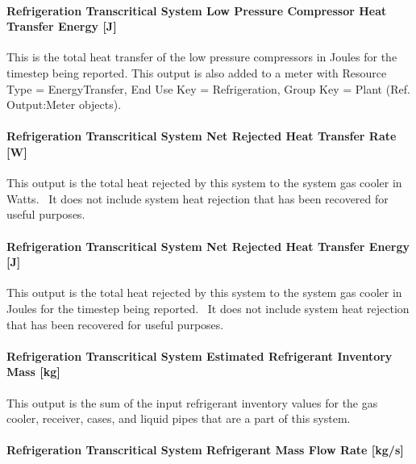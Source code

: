 \paragraph{Refrigeration Transcritical System Low Pressure Compressor Heat Transfer Energy {[}J{]}}\label{refrigeration-transcritical-system-low-pressure-compressor-heat-transfer-energy-j}

This is the total heat transfer of the low pressure compressors in Joules for the timestep being reported. This output is also added to a meter with Resource Type = EnergyTransfer, End Use Key = Refrigeration, Group Key = Plant (Ref. Output:Meter objects).

\paragraph{Refrigeration Transcritical System Net Rejected Heat Transfer Rate {[}W{]}}\label{refrigeration-transcritical-system-net-rejected-heat-transfer-rate-w}

This output is the total heat rejected by this system to the system gas cooler in Watts.~ It does not include system heat rejection that has been recovered for useful purposes.

\paragraph{Refrigeration Transcritical System Net Rejected Heat Transfer Energy {[}J{]}}\label{refrigeration-transcritical-system-net-rejected-heat-transfer-energy-j}

This output is the total heat rejected by this system to the system gas cooler in Joules for the timestep being reported.~ It does not include system heat rejection that has been recovered for useful purposes.

\paragraph{Refrigeration Transcritical System Estimated Refrigerant Inventory Mass {[}kg{]}}\label{refrigeration-transcritical-system-estimated-refrigerant-inventory-mass-kg}

This output is the sum of the input refrigerant inventory values for the gas cooler, receiver, cases, and liquid pipes that are a part of this system.

\paragraph{Refrigeration Transcritical System Refrigerant Mass Flow Rate {[}kg/s{]}}\label{refrigeration-transcritical-system-refrigerant-mass-flow-rate-kgs}

